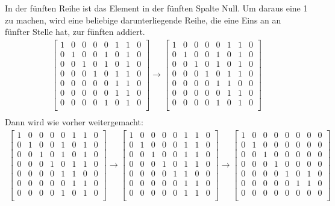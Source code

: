 \documentclass[a4paper,10pt,ngerman]{scrartcl}
\begin{document}
In der fünften Reihe ist das Element in der fünften Spalte Null. Um daraus eine 1 zu machen, wird eine beliebige darunterliegende Reihe, die eine Eins an an fünfter Stelle hat, zur fünften addiert.
\begin{align*}
\left[\begin{array}{ccccccc|c}
1&0&0&0&0&1&1&0\\
0&1&0&0&1&0&1&0\\
0&0&1&0&1&0&1&0\\
0&0&0&1&0&1&1&0\\
0&0&0&0&0&1&1&0\\
0&0&0&0&0&1&1&0\\
0&0&0&0&1&0&1&0\\
\end{array}\right]
\rightarrow \left[\begin{array}{ccccccc|c}
1&0&0&0&0&1&1&0\\
0&1&0&0&1&0&1&0\\
0&0&1&0&1&0&1&0\\
0&0&0&1&0&1&1&0\\
0&0&0&0&1&1&0&0\\
0&0&0&0&0&1&1&0\\
0&0&0&0&1&0&1&0\\
\end{array}\right]\\
\end{align*}
Dann wird wie vorher weitergemacht:
\begin{align*}
\left[\begin{array}{ccccccc|c}
1&0&0&0&0&1&1&0\\
0&1&0&0&1&0&1&0\\
0&0&1&0&1&0&1&0\\
0&0&0&1&0&1&1&0\\
0&0&0&0&1&1&0&0\\
0&0&0&0&0&1&1&0\\
0&0&0&0&1&0&1&0\\
\end{array}\right]
\rightarrow \left[\begin{array}{ccccccc|c}
1&0&0&0&0&1&1&0\\
0&1&0&0&0&1&1&0\\
0&0&1&0&0&1&1&0\\
0&0&0&1&0&1&1&0\\
0&0&0&0&1&1&0&0\\
0&0&0&0&0&1&1&0\\
0&0&0&0&0&1&1&0\\
\end{array}\right]
\rightarrow \left[\begin{array}{ccccccc|c}
1&0&0&0&0&0&0&0\\
0&1&0&0&0&0&0&0\\
0&0&1&0&0&0&0&0\\
0&0&0&1&0&0&0&0\\
0&0&0&0&1&0&1&0\\
0&0&0&0&0&1&1&0\\
0&0&0&0&0&0&0&0\\
\end{array}\right]\\
\end{align*}
\end{document}
